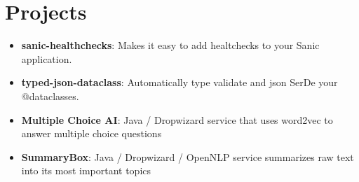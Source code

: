 \documentclass[letterpaper,11pt]{article}
\newcommand{\resumeItem}[2]{
  \item\small{
    \textbf{#1}{: #2 \vspace{-2pt}}
  }
}
\newcommand{\resumeSubItem}[2]{\resumeItem{#1}{#2}\vspace{-4pt}}
\newcommand{\resumeSubHeadingListStart}{\begin{itemize}[leftmargin=*]}
\newcommand{\resumeSubHeadingListEnd}{\end{itemize}}
\begin{document}
\section{Projects}
  \resumeSubHeadingListStart
  \resumeSubItem{sanic-healthchecks}
    {Makes it easy to add healtchecks to your Sanic application.}
  \resumeSubItem{typed-json-dataclass}
    {Automatically type validate and json SerDe your @dataclasses.}
  \resumeSubItem{Multiple Choice AI}
    {Java / Dropwizard service that uses word2vec to answer
    multiple choice questions}
  \resumeSubItem{SummaryBox}
    {Java / Dropwizard / OpenNLP service summarizes raw text into its most
    important topics}
  \resumeSubHeadingListEnd
\end{document}

